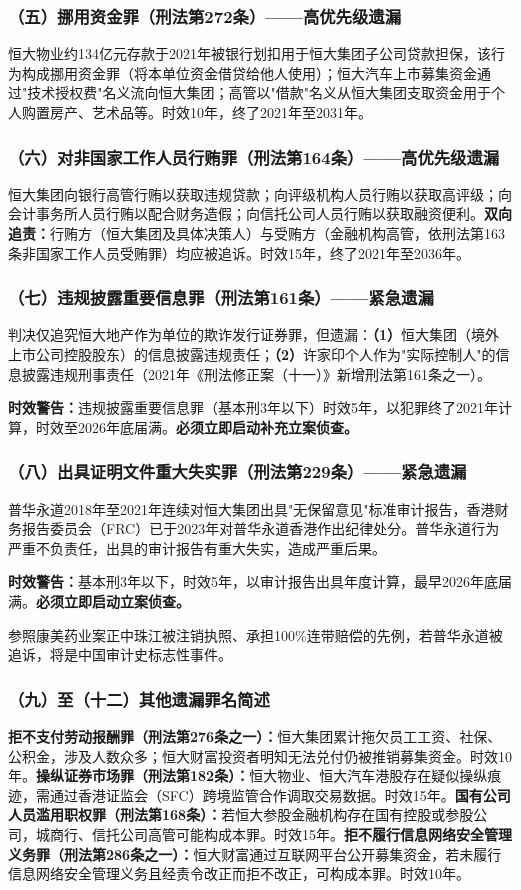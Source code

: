 \documentclass[11pt,a4paper,oneside,openany]{article}
\begin{document}
\subsubsection{（五）挪用资金罪（刑法第272条）——高优先级遗漏}
恒大物业约134亿元存款于2021年被银行划扣用于恒大集团子公司贷款担保，该行为构成挪用资金罪（将本单位资金借贷给他人使用）；恒大汽车上市募集资金通过"技术授权费"名义流向恒大集团；高管以"借款"名义从恒大集团支取资金用于个人购置房产、艺术品等。时效10年，终了2021年至2031年。

\subsubsection{（六）对非国家工作人员行贿罪（刑法第164条）——高优先级遗漏}
恒大集团向银行高管行贿以获取违规贷款；向评级机构人员行贿以获取高评级；向会计事务所人员行贿以配合财务造假；向信托公司人员行贿以获取融资便利。\textbf{双向追责：}行贿方（恒大集团及具体决策人）与受贿方（金融机构高管，依刑法第163条非国家工作人员受贿罪）均应被追诉。时效15年，终了2021年至2036年。

\subsubsection{（七）违规披露重要信息罪（刑法第161条）——紧急遗漏}
判决仅追究恒大地产作为单位的欺诈发行证券罪，但遗漏：\textbf{（1）}恒大集团（境外上市公司控股股东）的信息披露违规责任；\textbf{（2）}许家印个人作为"实际控制人"的信息披露违规刑事责任（2021年《刑法修正案（十一）》新增刑法第161条之一）。

\textbf{时效警告：}违规披露重要信息罪（基本刑3年以下）时效5年，以犯罪终了2021年计算，时效至2026年底届满。\textbf{必须立即启动补充立案侦查。}

\subsubsection{（八）出具证明文件重大失实罪（刑法第229条）——紧急遗漏}
普华永道2018年至2021年连续对恒大集团出具"无保留意见"标准审计报告，香港财务报告委员会（FRC）已于2023年对普华永道香港作出纪律处分。普华永道行为严重不负责任，出具的审计报告有重大失实，造成严重后果。

\textbf{时效警告：}基本刑3年以下，时效5年，以审计报告出具年度计算，最早2026年底届满。\textbf{必须立即启动立案侦查。}

参照康美药业案正中珠江被注销执照、承担100\%连带赔偿的先例，若普华永道被追诉，将是中国审计史标志性事件。

\subsubsection{（九）至（十二）其他遗漏罪名简述}
\textbf{拒不支付劳动报酬罪（刑法第276条之一）：}恒大集团累计拖欠员工工资、社保、公积金，涉及人数众多；恒大财富投资者明知无法兑付仍被推销募集资金。时效10年。\textbf{操纵证券市场罪（刑法第182条）：}恒大物业、恒大汽车港股存在疑似操纵痕迹，需通过香港证监会（SFC）跨境监管合作调取交易数据。时效15年。\textbf{国有公司人员滥用职权罪（刑法第168条）：}若恒大参股金融机构存在国有控股或参股公司，城商行、信托公司高管可能构成本罪。时效15年。\textbf{拒不履行信息网络安全管理义务罪（刑法第286条之一）：}恒大财富通过互联网平台公开募集资金，若未履行信息网络安全管理义务且经责令改正而拒不改正，可构成本罪。时效10年。
\end{document}
